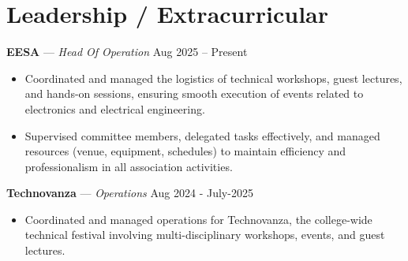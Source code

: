 \documentclass[a4paper,11pt]{article}
\begin{document}
\section{Leadership / Extracurricular} 

\textbf{EESA} --- \textit{Head Of Operation} \hfill Aug 2025 -- Present
\begin{itemize}[leftmargin=*] 
    \item Coordinated and managed the logistics of technical workshops, guest lectures, and hands-on sessions, ensuring smooth execution of events related to electronics and electrical engineering.
    \item Supervised committee members, delegated tasks effectively, and managed resources (venue, equipment, schedules) to maintain efficiency and professionalism in all association activities.
\end{itemize} 

\textbf{Technovanza} --- \textit{Operations} \hfill Aug 2024 - July-2025
\begin{itemize}[leftmargin=*] 
    \item Coordinated and managed operations for Technovanza, the college-wide technical festival involving multi-disciplinary workshops, events, and guest lectures.
\end{itemize}
\end{document}

